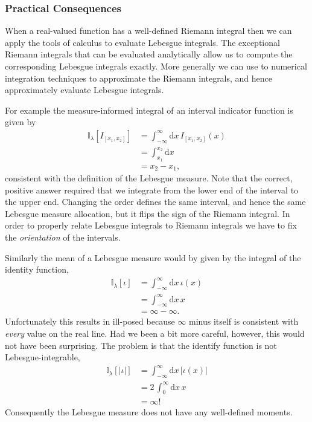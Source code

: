 \documentclass[
  letterpaper,
  DIV=11,
  numbers=noendperiod]{scrartcl}
\begin{document}
\hypertarget{practical-consequences-1}{%
\subsubsection{Practical Consequences}\label{practical-consequences-1}}

When a real-valued function has a well-defined Riemann integral then we
can apply the tools of calculus to evaluate Lebesgue integrals. The
exceptional Riemann integrals that can be evaluated analytically allow
us to compute the corresponding Lebesgue integrals exactly. More
generally we can use to numerical integration techniques to approximate
the Riemann integrals, and hence approximately evaluate Lebesgue
integrals.

For example the measure-informed integral of an interval indicator
function is given by \begin{align*}
\mathbb{I}_{\lambda}[I_{[x_{1}, x_{2}]}]
&=
\int_{-\infty}^{\infty} \mathrm{d} x \, I_{[x_{1}, x_{2}]}(x)
\\
&=
\int_{x_{1}}^{x_{2}} \mathrm{d} x
\\
&=
x_{2} - x_{1},
\end{align*} consistent with the definition of the Lebesgue measure.
Note that the correct, positive answer required that we integrate from
the lower end of the interval to the upper end. Changing the order
defines the same interval, and hence the same Lebesgue measure
allocation, but it flips the sign of the Riemann integral. In order to
properly relate Lebesgue integrals to Riemann integrals we have to fix
the \emph{orientation} of the intervals.

Similarly the mean of a Lebesgue measure would by given by the integral
of the identity function, \begin{align*}
\mathbb{I}_{\lambda}[\iota]
&=
\int_{-\infty}^{\infty} \mathrm{d} x \, \iota(x)
\\
&=
\int_{-\infty}^{\infty} \mathrm{d} x \, x
\\
&=
\infty - \infty.
\end{align*} Unfortunately this results in ill-posed because \(\infty\)
minus itself is consistent with \emph{every} value on the real line. Had
we been a bit more careful, however, this would not have been
surprising. The problem is that the identify function is not
Lebesgue-integrable, \begin{align*}
\mathbb{I}_{\lambda}[| \iota |]
&=
\int_{-\infty}^{\infty} \mathrm{d} x \, | \iota(x) |
\\
&=
2 \, \int_{0}^{\infty} \mathrm{d} x \, x
\\
&=
\infty!
\end{align*} Consequently the Lebesgue measure does not have any
well-defined moments.
\end{document}
